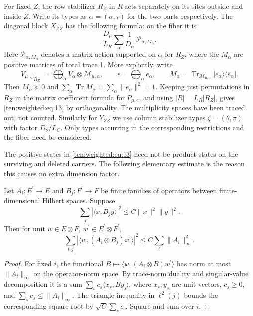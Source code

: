 For fixed \(Z\), the row stabilizer \(R_Z\) in \(R\) acts separately on its sites outside and inside \(Z\). Write its types as \(\alpha=(\sigma,\tau)\) for the two parts respectively. The diagonal block \(X_{ZZ}\) has the following formula: on the fiber it is
\begin{equation}
 \frac{D_\mu}{L_R}\sum_{\alpha}\frac{1}{D_\alpha}\, \mathcal P_{\alpha,M_\alpha}.             \label{ten:weighted:eq:13}
\end{equation}
Here \(\mathcal P_{\alpha,M_\alpha}\) denotes a matrix action supported on \(\alpha\) for \(R_Z\), where the \(M_\alpha\) are positive matrices of total trace 1. More explicitly, write
\[
 V_\mu\!\downarrow_{R_Z}=\bigoplus_\alpha V_\alpha\otimes\mathcal M_{\mu,\alpha},\qquad
 e=\bigoplus_\alpha e_\alpha,\qquad
 M_\alpha=\operatorname{Tr}_{\mathcal M_{\mu,\alpha}}|e_\alpha\rangle\langle e_\alpha|.
\]
Then $M_\alpha\succeq0$ and $\sum_\alpha\operatorname{Tr}M_\alpha=\sum_\alpha\|e_\alpha\|^2=1$. Keeping just permutations in $R_Z$ in the matrix coefficient formula for $P_{\mu,e}$, and using $|R|=L_R|R_Z|$, gives \eqref{ten:weighted:eq:13} by orthogonality. The multiplicity spaces have been traced out, not counted. Similarly for \(Y_{ZZ}\) we use column stabilizer types \(\zeta=(\theta,\pi)\) with factor \(D_\nu/L_C\). Only types occurring in the corresponding restrictions and the fiber need be considered.

The positive states in \eqref{ten:weighted:eq:13} need not be product states on the surviving and deleted carriers. The following elementary estimate is the reason this causes no extra dimension factor.
\begin{lemma}\label{lem:entangled}
Let \(A_i:E^\prime\to E\) and \(B_j:F^\prime\to F\) be finite families of operators between finite-dimensional Hilbert spaces. Suppose
\[\sum_j|\langle x,B_jy\rangle|^2\le C\|x\|^2\|y\|^2.\]
Then for unit \(w\in E\otimes F\), \(w^\prime\in E^\prime\otimes F^\prime\),
\[\sum_{i,j}|\langle w,(A_i\otimes B_j)w^\prime\rangle|^2\le C\sum_i\|A_i\|_\infty^2.\]
\end{lemma}
\begin{proof}
For fixed \(i\), the functional \(B\mapsto\langle w,(A_i\otimes B)w^\prime\rangle\) has norm at most \(\|A_i\|_\infty\) on the operator-norm space. By trace-norm duality and singular-value decomposition it is a sum \(\sum_s c_s\langle x_s,By_s\rangle\), where \(x_s,y_s\) are unit vectors, \(c_s\ge0\), and \(\sum_s c_s\le\|A_i\|_\infty\). The triangle inequality in \(\ell^2(j)\) bounds the corresponding square root by \(\sqrt C\sum_s c_s\). Square and sum over \(i\).\end{proof}

